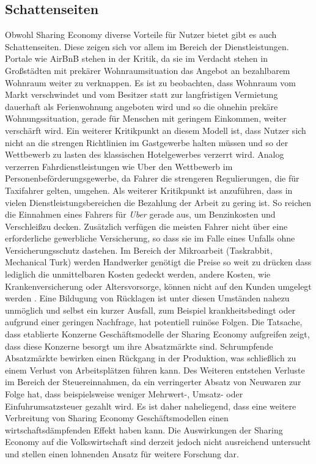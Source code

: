 \documentclass[a4paper]{scrartcl}
\begin{document}
\begin{multicols}{2}
	
		\subsection{Schattenseiten}
			Obwohl Sharing Economy diverse Vorteile f\"ur Nutzer bietet gibt es auch Schattenseiten. Diese zeigen sich vor allem im Bereich der Dienstleistungen. Portale wie AirBnB stehen in der Kritik, da sie im Verdacht stehen in Gro\ss st\"adten mit prek\"arer Wohnraumsituation das Angebot an bezahlbarem Wohnraum weiter zu verknappen. Es ist zu beobachten, dass Wohnraum vom Markt verschwindet und vom Besitzer statt zur langfristigen Vermietung dauerhaft als Ferienwohnung angeboten wird und so die ohnehin prek\"are Wohnungssituation, gerade f\"ur Menschen mit geringem Einkommen, weiter versch\"arft wird. Ein weiterer Kritikpunkt an diesem Modell ist, dass Nutzer sich nicht an die strengen Richtlinien im Gastgewerbe halten m\"ussen und so der Wettbewerb zu lasten des klassischen Hotelgewerbes verzerrt wird. Analog verzerren Fahrdienstleistungen wie Uber den Wettbewerb im Personenbef\"orderungsgewerbe, da Fahrer die strengeren Regulierungen, die f\"ur Taxifahrer gelten, umgehen. Als weiterer Kritikpunkt ist anzuf\"uhren, dass in vielen Dienstleistungsbereichen die Bezahlung der Arbeit zu gering ist. So reichen die Einnahmen eines Fahrers f\"ur \textit{Uber} gerade aus, um Benzinkosten und Verschlei\ss  zu decken. Zus\"atzlich verf\"ugen die meisten Fahrer nicht \"uber eine erforderliche gewerbliche Versicherung, so dass sie im Falle eines Unfalls ohne Versicherungsschutz dastehen. Im Bereich der Mikroarbeit (Taskrabbit, Mechanical Turk) werden Handwerker gen\"otigt die Preise so weit zu dr\"ucken dass lediglich die unmittelbaren Kosten gedeckt werden, andere Kosten, wie Krankenversicherung oder Altersvorsorge, k\"onnen nicht auf den Kunden umgelegt werden \cite{Malhotra:2014:DSS:2684442.2668893}. Eine Bildugung von Rücklagen ist unter diesen Umst\"anden nahezu unm\"oglich und selbst ein kurzer Ausfall, zum Beispiel krankheitsbedingt oder aufgrund einer geringen Nachfrage, hat potentiell ruin\"ose Folgen. Die Tatsache, dass etablierte Konzerne Gesch\"aftsmodelle der Sharing Economy aufgreifen zeigt, dass diese Konzerne besorgt um ihre Absatzm\"arkte sind. Schrumpfende Absatzm\"arkte bewirken einen R\"uckgang in der Produktion, was schlie\ss lich zu einem Verlust von Arbeitspl\"atzen f\"uhren kann. Des Weiteren entstehen Verluste im Bereich der Steuereinnahmen, da ein verringerter Absatz von Neuwaren zur Folge hat, dass beispielsweise weniger Mehrwert-, Umsatz- oder Einfuhrumsatzsteuer gezahlt wird. Es ist daher naheliegend, dass eine weitere Verbreitung von Sharing Economy Gesch\"aftsmodellen einen wirtschaftsd\"ampfenden Effekt haben kann. Die Auswirkungen der Sharing Economy auf die Volkswirtschaft sind derzeit jedoch nicht ausreichend untersucht und stellen einen lohnenden Ansatz f\"ur weitere Forschung dar.
			

\end{multicols}
\end{document}

